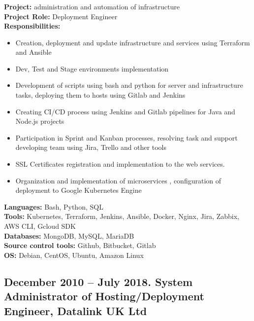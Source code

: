 \documentclass[letterpaper]{article}
\begin{document}
\subsubsection{}
\label{sec-2-1-1}
\textbf{Project:} administration and automation of infrastructure\\
\textbf{Project Role:}  Deployment Engineer\\
\textbf{Responsibilities:}\\
\begin{itemize}
\item Creation, deployment and update infrastructure and services using Terraform and Ansible
\item Dev, Test and Stage environments implementation
\item Development of scripts using bash and python for server and infrastructure tasks, deploying them to hosts using Gitlab and Jenkins
\item Creating CI/CD process using Jenkins and Gitlab pipelines for Java and Node.js projects
\item Participation in Sprint and Kanban processes, resolving task and support developing team using Jira, Trello and other tools
\item SSL Certificates registration and implementation to the web services.
\item Organization and implementation of microservices , configuration of deployment to Google Kubernetes Engine
\end{itemize}
\textbf{Languages:} Bash, Python, SQL\\
\textbf{Tools:} Kubernetes, Terraform, Jenkins, Ansible, Docker, Nginx, Jira, Zabbix, AWS CLI, Gcloud SDK \\ 
\textbf{Databases:} MongoDB, MySQL, MariaDB\\
\textbf{Source control tools:} Github, Bitbucket, Gitlab\\
\textbf{OS:} Debian, CentOS, Ubuntu, Amazon Linux \\
\subsection{{December 2010 – July 2018}. System Administrator of Hosting/Deployment Engineer, Datalink UK Ltd}
\label{sec-2-1}
\end{document}
